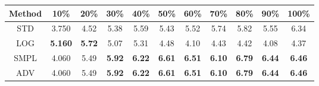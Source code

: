 \documentclass{standalone}
\begin{document}
\begin{tabular}{c|cccccccccc}
      \toprule
      Method & 10\% & 20\% & 30\% & 40\% & 50\% & 60\% & 70\% & 80\% & 90\% & 100\% \\
      \midrule
STD & 3.750 & 4.52 & 5.38 & 5.59 & 5.43 & 5.52 & 5.74 & 5.82 & 5.55 & 6.34\\
LOG & \textbf{5.160} & \textbf{5.72} & 5.07 & 5.31 & 4.48 & 4.10 & 4.43 & 4.42 & 4.08 & 4.37\\
SMPL & 4.060 & 5.49 & \textbf{5.92} & \textbf{6.22} & \textbf{6.61} & \textbf{6.51} & \textbf{6.10} & \textbf{6.79} & \textbf{6.44} & \textbf{6.46}\\
ADV & 4.060 & 5.49 & \textbf{5.92} & \textbf{6.22} & \textbf{6.61} & \textbf{6.51} & \textbf{6.10} & \textbf{6.79} & \textbf{6.44} & \textbf{6.46}\\
  \bottomrule
\end{tabular}
\end{document}
